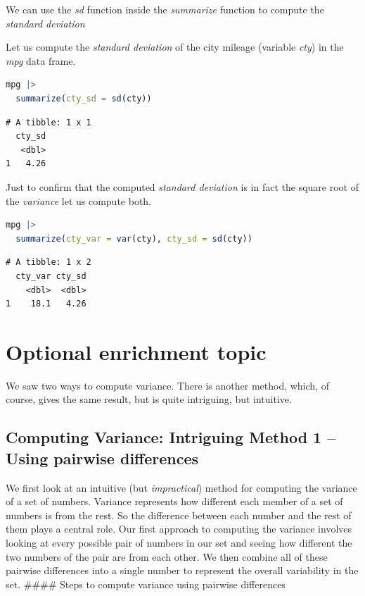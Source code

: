 \documentclass[
  12pt,
  letterpaper,
  DIV=11,
  numbers=noendperiod]{scrreprt}
\begin{document}
We can use the \emph{sd} function inside the \emph{summarize} function
to compute the \emph{standard deviation}

Let us compute the \emph{standard deviation} of the city mileage
(variable \emph{cty}) in the \emph{mpg} data frame.

\begin{lstlisting}[language=R]
mpg |>
  summarize(cty_sd = sd(cty))
\end{lstlisting}

\begin{lstlisting}
# A tibble: 1 x 1
  cty_sd
   <dbl>
1   4.26
\end{lstlisting}

Just to confirm that the computed \emph{standard deviation} is in fact
the square root of the \emph{variance} let us compute both.

\begin{lstlisting}[language=R]
mpg |>
  summarize(cty_var = var(cty), cty_sd = sd(cty))
\end{lstlisting}

\begin{lstlisting}
# A tibble: 1 x 2
  cty_var cty_sd
    <dbl>  <dbl>
1    18.1   4.26
\end{lstlisting}

\section{Optional enrichment topic}\label{optional-enrichment-topic}

We saw two ways to compute variance. There is another method, which, of
course, gives the same result, but is quite intriguing, but intuitive.

\subsection{Computing Variance: Intriguing Method 1 -- Using pairwise
differences}\label{computing-variance-intriguing-method-1-using-pairwise-differences}

We first look at an intuitive (but \emph{impractical}) method for
computing the variance of a set of numbers. Variance represents how
different each member of a set of numbers is from the rest. So the
difference between each number and the rest of them plays a central
role. Our first approach to computing the variance involves looking at
every possible pair of numbers in our set and seeing how different the
two numbers of the pair are from each other. We then combine all of
these pairwise differences into a single number to represent the overall
variability in the set. \#\#\#\# Steps to compute variance using
pairwise differences
\end{document}
